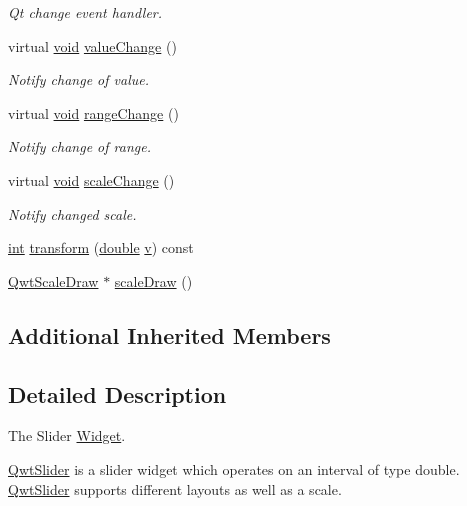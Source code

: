 \begin{DoxyCompactItemize}
\begin{DoxyCompactList}\small\item\em Qt change event handler. \end{DoxyCompactList}\item 
virtual \hyperlink{group___u_a_v_objects_plugin_ga444cf2ff3f0ecbe028adce838d373f5c}{void} \hyperlink{class_qwt_slider_a62380259b0831ad98a1b0ad011f32bea}{value\-Change} ()
\begin{DoxyCompactList}\small\item\em Notify change of value. \end{DoxyCompactList}\item 
virtual \hyperlink{group___u_a_v_objects_plugin_ga444cf2ff3f0ecbe028adce838d373f5c}{void} \hyperlink{class_qwt_slider_ae8eff3a30ef4086cac42d244cef81ac0}{range\-Change} ()
\begin{DoxyCompactList}\small\item\em Notify change of range. \end{DoxyCompactList}\item 
virtual \hyperlink{group___u_a_v_objects_plugin_ga444cf2ff3f0ecbe028adce838d373f5c}{void} \hyperlink{class_qwt_slider_a31ae4c53eb17d77ee0fd846ff6eea7e3}{scale\-Change} ()
\begin{DoxyCompactList}\small\item\em Notify changed scale. \end{DoxyCompactList}\item 
\hyperlink{ioapi_8h_a787fa3cf048117ba7123753c1e74fcd6}{int} \hyperlink{class_qwt_slider_a133b9b2052523878cd75e4084a47de53}{transform} (\hyperlink{_super_l_u_support_8h_a8956b2b9f49bf918deed98379d159ca7}{double} \hyperlink{glext_8h_a14cfbe2fc2234f5504618905b69d1e06}{v}) const 
\item 
\hyperlink{class_qwt_scale_draw}{Qwt\-Scale\-Draw} $\ast$ \hyperlink{class_qwt_slider_ac9d9cf23f22f06a02c9a60fb91adb0c0}{scale\-Draw} ()
\end{DoxyCompactItemize}
\subsection*{Additional Inherited Members}


\subsection{Detailed Description}
The Slider \hyperlink{class_widget}{Widget}. 

\hyperlink{class_qwt_slider}{Qwt\-Slider} is a slider widget which operates on an interval of type double. \hyperlink{class_qwt_slider}{Qwt\-Slider} supports different layouts as well as a scale.



